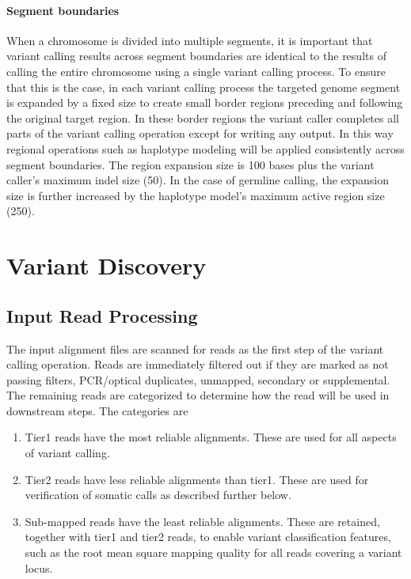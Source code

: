 \documentclass{article}
\begin{document}
\paragraph{Segment boundaries} When a chromosome is divided into multiple segments, it is important that variant calling results across segment boundaries are identical to the results of calling the entire chromosome using a single variant calling process. To ensure that this is the case, in each variant calling process the targeted genome segment is expanded by a fixed size to create small border regions preceding and following the original target region. In these border regions the variant caller completes all parts of the variant calling operation except for writing any output. In this way regional operations such as haplotype modeling will be applied consistently across segment boundaries. The region expansion size is 100 bases plus the variant caller's maximum indel size (50). In the case of germline calling, the expansion size is further increased by the haplotype model's maximum active region size (250).

\section{Variant Discovery}

\subsection{Input Read Processing}

The input alignment files are scanned for reads as the first step of the variant calling operation. Reads are immediately filtered out if they are marked as not passing filters, PCR/optical duplicates, unmapped, secondary or supplemental. The remaining reads are categorized to determine how the read will be used in downstream steps. The categories are
\begin{enumerate}
    \item Tier1 reads have the most reliable alignments. These are used for all aspects of variant calling.
    \item Tier2 reads have less reliable alignments than tier1. These are used for verification of somatic calls as described further below.
    \item Sub-mapped reads have the least reliable alignments. These are retained, together with tier1 and tier2 reads, to enable  variant classification features, such as the root mean square mapping quality for all reads covering a variant locus.
\end{enumerate}
\end{document}
